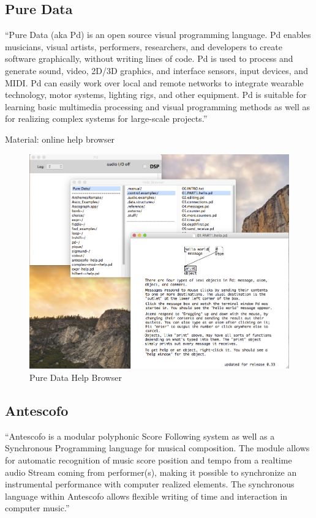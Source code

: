 \documentclass[onecolumn,nocopyrightspace,preprint]{sigplanconf}
\begin{document}
\subsection{Pure Data}

``Pure Data (aka Pd) is an open source visual programming language. Pd enables
musicians, visual artists, performers, researchers, and developers to create
software graphically, without writing lines of code. Pd is used to process
and generate sound, video, 2D/3D graphics, and interface sensors, input
devices, and MIDI. Pd can easily work over local and remote networks to
integrate wearable technology, motor systems, lighting rigs, and other
equipment. Pd is suitable for learning basic multimedia processing and
visual programming methods as well as for realizing complex systems for
large-scale projects.''~\cite{website:puredata}

Material: online help browser

\begin{figure}[ht]
    \centering
    \includegraphics[scale=0.4]{fig/pd-help-browser.png}
    \caption{Pure Data Help Browser}
    \label{fig:pd-help-browser}
\end{figure}


\subsection{Antescofo}

``Antescofo is a modular polyphonic Score Following system as well as a
Synchronous Programming language for musical composition. The module allows
for automatic recognition of music score position and tempo from a realtime
audio Stream coming from performer(s), making it possible to synchronize an
instrumental performance with computer realized elements. The synchronous
language within Antescofo allows flexible writing of time and interaction in
computer music.''~\cite{website:antescofo}
\end{document}
